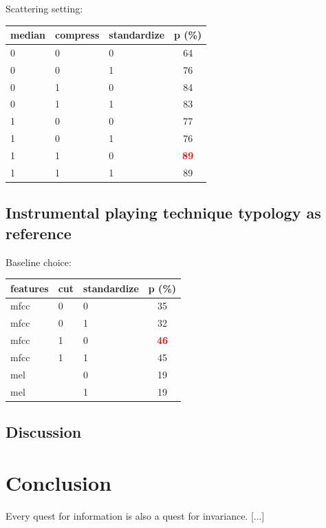 \documentclass{article}
\begin{document}
Scattering setting:
\begin{tabular}{lllc}
median & compress & standardize & p (\%) \\
\hline
0 & 0 & 0 & 64 \\
0 & 0 & 1 & 76 \\
0 & 1 & 0 & 84 \\
0 & 1 & 1 & 83 \\
1 & 0 & 0 & 77 \\
1 & 0 & 1 & 76 \\
1 & 1 & 0 & \textbf{\textcolor{red}{89}} \\
1 & 1 & 1 & 89 \\
\end{tabular}


\subsection{Instrumental playing technique typology as reference}

Baseline choice:
\begin{tabular}{lllc}
features & cut & standardize & p (\%) \\
\hline
mfcc & 0 & 0 & 35 \\
mfcc & 0 & 1 & 32 \\
mfcc & 1 & 0 & \textbf{\textcolor{red}{46}} \\
mfcc & 1 & 1 & 45 \\
mel &  & 0 & 19 \\
mel &  & 1 & 19 \\
\end{tabular}


\subsection{Discussion}


\section{Conclusion}
Every quest for information is also a quest for invariance. [...]
\end{document}
